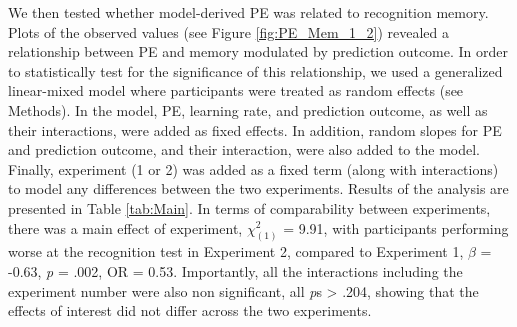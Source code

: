 \documentclass[a4paper,12pt]{article}
\begin{document}
\par
We then tested whether model-derived PE was related to recognition memory. Plots of the observed values (see Figure \ref{fig:PE_Mem_1_2}) revealed a relationship between PE and memory modulated by prediction outcome. In order to statistically test for the significance of this relationship, we used a generalized linear-mixed model where participants were treated as random effects (see Methods). In the model, PE, learning rate, and prediction outcome, as well as their interactions, were added as fixed effects. In addition, random slopes for PE and prediction outcome, and their interaction, were also added to the model. Finally, experiment (1 or 2) was added as a fixed term (along with interactions) to model any differences between the two experiments. Results of the analysis are presented in Table \ref{tab:Main}.
  In terms of comparability between experiments, there was a main effect of experiment, $\chi^2_{(1)}$ = 9.91, with participants performing worse at the recognition test in Experiment 2, compared to Experiment 1, $\beta$ = -0.63, \textit{p} = .002, OR = 0.53. Importantly, all the interactions including the experiment number were also non significant, all \textit{p}s > .204,  showing that the effects of interest did not differ across the two experiments. \par
\end{document}
